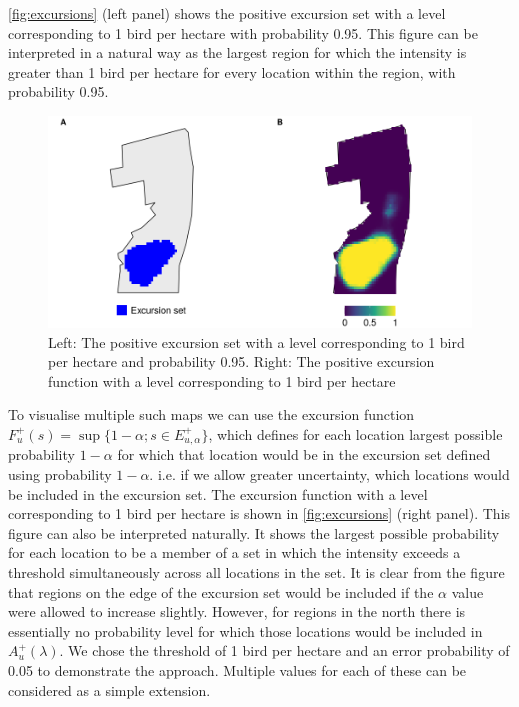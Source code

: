 \documentclass{stylefile16/statsoc}
\begin{document}
\autoref{fig:excursions} (left panel) shows the positive excursion set with a level corresponding to 1 bird per hectare with probability 0.95.  This figure can be interpreted in a natural way as the largest region for which the intensity is greater than 1 bird per hectare for every location within the region, with probability 0.95.
\begin{figure}
	\includegraphics[scale=0.5]{figures/excursions.png}
	\caption{Left:  The positive excursion set with a level corresponding to 1 bird per hectare and probability 0.95.  Right: The positive excursion function with a level corresponding to 1 bird per hectare}
	\label{fig:excursions}
\end{figure}
To visualise multiple such maps we can use the excursion function $F_u^{+}(s) = \sup \{1 - \alpha ; s \in E_{u,\alpha}^+ \}$, which defines for each location largest possible probability $1 -\alpha$ for which that location would be in the excursion set defined using probability $1 - \alpha$.  i.e.  if we allow greater uncertainty, which locations would be included in the excursion set.  The excursion function with a level corresponding to 1 bird per hectare is shown in \autoref{fig:excursions} (right panel).  This figure can also be interpreted naturally.  It shows the largest possible probability for each location to be a member of a set in which the intensity exceeds a threshold simultaneously across all locations in the set. It is clear from the figure that regions on the edge of the excursion set would be included if the $\alpha$ value were allowed to increase slightly.  However, for regions in the north there is essentially no probability level for which those locations would be included in $A_u^{+}(\lambda)$.
We chose the threshold of 1 bird per hectare and an error probability of 0.05 to demonstrate the approach.  Multiple values for each of these can be considered as a simple extension.
\end{document}
